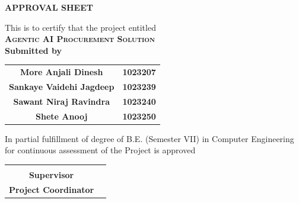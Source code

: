 
\begin{center}

{\LARGE\bf APPROVAL SHEET}

\vspace{1cm}

{\large This is to certify that the project entitled}\\[0.3cm]

{\Large\bf \textsc{Agentic AI Procurement Solution}}\\[0.3cm]

{\large\bf Submitted by}\\[0.5cm]

\begin{table}[h]
\centering
\Large
\begin{tabular}{cc}
\textbf{More Anjali Dinesh} & \textbf{1023207} \\
\textbf{Sankaye Vaidehi Jagdeep} & \textbf{1023239} \\
\textbf{Sawant Niraj Ravindra} & \textbf{1023240} \\
\textbf{Shete Anooj} & \textbf{1023250}
\end{tabular}
\end{table}

\vspace{1cm}


In partial fulfillment of degree of B.E. (Semester VII) in Computer Engineering for continuous assessment of the Project is approved \\[2cm]


\begin{tabular}{cc}
\begin{minipage}{0.42\textwidth}
\centering
\rule{5cm}{0.2px}\\
\textbf{Supervisor}
\end{minipage}
&
\begin{minipage}{0.42\textwidth}
\centering
\rule{5cm}{0.2px}\\
\textbf{Project Coordinator}
\end{minipage}
\end{tabular}

\vspace{2.2cm}



\end{center}
